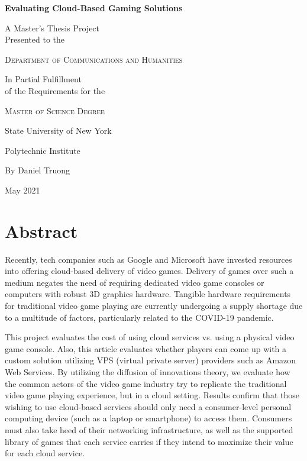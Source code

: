 \documentclass[titlepage, 12pt]{article}
\begin{document}
	\begin{titlingpage}
	\centering
    	{\huge\bfseries Evaluating Cloud-Based Gaming Solutions\par}
    	\vspace{2cm}

	{\Large  A Master’s Thesis Project \\}	
	{\Large  Presented to the \\}	
    	{\scshape\LARGE Department of Communications and Humanities \par}
	
	\vfill
    	{\Large  In Partial Fulfillment \\}	
	{\Large  of the Requirements for the \\}
    	{\scshape\LARGE Master of Science Degree \par}
	
	\vfill
	{\LARGE State University of New York \par}
	{\LARGE Polytechnic Institute \par}

	\vfill
	{\Large By Daniel Truong\par}
	{\large May 2021\par}
	\end{titlingpage}

\section{Abstract}

Recently, tech companies such as Google and Microsoft have invested resources into offering cloud-based delivery of video games. Delivery of games over such a medium negates the need of requiring dedicated video game consoles or computers with robust 3D graphics hardware. Tangible hardware requirements for traditional video game playing are currently undergoing a supply shortage due to a multitude of factors, particularly related to the COVID-19 pandemic.

This project evaluates the cost of using cloud services vs. using a physical video game console. Also, this article evaluates whether players can come up with a custom solution utilizing VPS (virtual private server) providers such as Amazon Web Services. By utilizing the diffusion of innovations theory, we evaluate how the common actors of the video game industry try to replicate the traditional video game playing experience, but in a cloud setting. Results confirm that those wishing to use cloud-based services should only need a consumer-level personal computing device (such as a laptop or smartphone) to access them. Consumers must also take heed of their networking infrastructure, as well as the supported library of games that each service carries if they intend to maximize their value for each cloud service.
\end{document}
